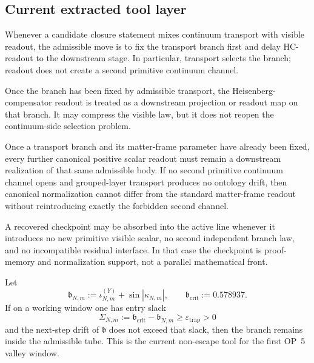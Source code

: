 \subsection*{Current extracted tool layer}
\begin{description}[leftmargin=2.2em, labelindent=0pt, itemsep=0.5em]
  \item[Transport-first tool.] Whenever a candidate closure statement mixes continuum transport with visible readout, the admissible move is to fix the transport branch first and delay HC-readout to the downstream stage. In particular, transport selects the branch; readout does not create a second primitive continuum channel.
  \item[Readout-after-transport tool.] Once the branch has been fixed by admissible transport, the Heisenberg-compensator readout is treated as a downstream projection or readout map on that branch. It may compress the visible law, but it does not reopen the continuum-side selection problem.
  \item[Admissible-readout uniqueness tool.] Once a transport branch and its matter-frame parameter have already been fixed, every further canonical positive scalar readout must remain a downstream realization of that same admissible body. If no second primitive continuum channel opens and grouped-layer transport produces no ontology drift, then canonical normalization cannot differ from the standard matter-frame readout without reintroducing exactly the forbidden second channel.
  \item[Checkpoint-absorption tool.] A recovered checkpoint may be absorbed into the active line whenever it introduces no new primitive visible scalar, no second independent branch law, and no incompatible residual interface. In that case the checkpoint is proof-memory and normalization support, not a parallel mathematical front.
  \item[Epsilon-trap tool.] Let
  \[
    \mathfrak b_{N,m}:=\iota^{(Y)}_{N,m}+\sin|\kappa_{N,m}|,
    \qquad
    \mathfrak b_{\mathrm{crit}}:=0.578937.
  \]
  If on a working window one has entry slack
  \[
    \Sigma_{N,m}:=\mathfrak b_{\mathrm{crit}}-\mathfrak b_{N,m}\ge \varepsilon_{\mathrm{trap}}>0
  \]
  and the next-step drift of \(\mathfrak b\) does not exceed that slack, then the branch remains inside the admissible tube. This is the current non-escape tool for the first OP~5 valley window.


\end{description}
